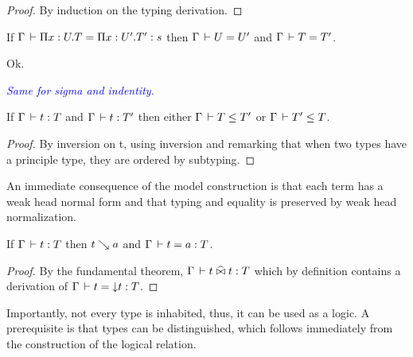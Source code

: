 \documentclass[a4paper,english]{lipics-utf8x}
\newcommand\meta[1]{\noindent\textcolor{blue}{\emph{#1}}}
\begin{document}
  \begin{proof}
    By induction on the typing derivation.
  \end{proof}

  \begin{lemma}
    If $\Gamma \,\vdash \Pi x:U.T = \Pi x:U'.T' : s$ then $\Gamma \,\vdash U = U'$
    and $\Gamma \,\vdash T = T'$.
  \end{lemma}
  Ok.

  \meta{Same for sigma and indentity.}

  \begin{lemma}
    If $\Gamma \,\vdash t : T$ and $\Gamma \,\vdash t : T'$ then either
    $\Gamma \,\vdash T \le T'$ or $\Gamma \,\vdash T' \le T$.
  \end{lemma}

  \begin{proof}
    By inversion on t, using inversion and remarking that when two types
    have a principle type, they are ordered by subtyping.
  \end{proof}


  An immediate consequence of the model construction is that each term has a
  weak head normal form and that typing and equality is preserved by weak head
  normalization.

  \begin{theorem}
    If $\Gamma \,\vdash t : T$ then $t \searrow a$ and $\Gamma \,\vdash t = a : T$.
  \end{theorem}

  \begin{proof}
    By the fundamental theorem, $\Gamma \,\vdash t \mathrel{\widehat{\bowtie}} t : T$ which by definition
    contains a derivation of $\Gamma \,\vdash t = {\downarrow} t : T$.
  \end{proof}


  Importantly, not every type is inhabited, thus, it can be used as a logic.
  A prerequisite is that types can be distinguished, which follows immediately
  from the construction of the logical relation.
\end{document}
